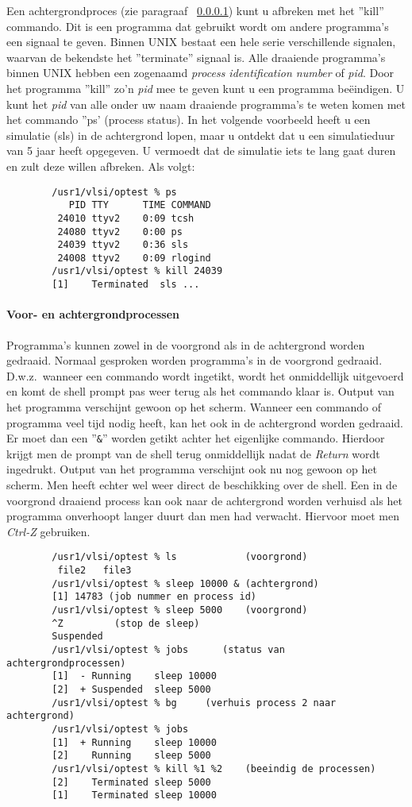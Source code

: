 Een achtergrondproces (zie paragraaf ~\ref{Voor- en achtergrondprocessen})
kunt u afbreken met het ''kill'' commando.
Dit is een programma dat gebruikt wordt om andere programma's een signaal te geven.
Binnen UNIX bestaat een hele serie verschillende signalen,
waarvan de bekendste het ''terminate'' signaal is.
Alle draaiende programma's binnen UNIX hebben een
zogenaamd {\em process identification number} of {\em pid}.
Door het programma ''kill'' zo'n {\em pid} mee te geven
kunt u een programma be\"eindigen.
U kunt het {\em pid} van alle onder uw naam draaiende programma's te weten komen met
het commando ''ps' (process status).
In het volgende voorbeeld heeft u een simulatie (sls) in de achtergrond lopen,
maar u ontdekt dat u een simulatieduur van 5 jaar heeft opgegeven.
U vermoedt dat de simulatie iets te lang gaat duren
en zult deze willen afbreken.
Als volgt:
\begin{verbatim}
        /usr1/vlsi/optest % ps
           PID TTY      TIME COMMAND
         24010 ttyv2    0:09 tcsh  
         24080 ttyv2    0:00 ps 
         24039 ttyv2    0:36 sls
         24008 ttyv2    0:09 rlogind
        /usr1/vlsi/optest % kill 24039
        [1]    Terminated  sls ...
\end{verbatim}
\paragraph{Voor- en achtergrondprocessen}
\label{Voor- en achtergrondprocessen}
Programma's kunnen zowel in de voorgrond als in de
achtergrond worden gedraaid.
Normaal gesproken worden programma's in de voorgrond gedraaid.
D.w.z.\ wanneer een commando wordt ingetikt, wordt het onmiddellijk uitgevoerd
en komt de shell prompt pas weer terug als het commando klaar is.
Output van het programma verschijnt gewoon op het scherm.
Wanneer een commando of programma veel tijd nodig heeft, kan het ook
in de achtergrond worden gedraaid.
Er moet dan een ''{\tt \&}'' worden getikt achter
het eigenlijke commando. Hierdoor krijgt men de prompt van
de shell terug onmiddellijk nadat de {\em Return} wordt ingedrukt.
Output van het programma verschijnt ook nu nog gewoon op het scherm.
Men heeft echter wel weer direct de beschikking over de shell.
Een in de voorgrond draaiend process kan ook naar de achtergrond worden
verhuisd als het programma onverhoopt langer duurt dan men had verwacht.
Hiervoor moet men {\em Ctrl-Z} gebruiken.
\begin{verbatim}
        /usr1/vlsi/optest % ls            (voorgrond)
         file2   file3
        /usr1/vlsi/optest % sleep 10000 & (achtergrond)
        [1] 14783 (job nummer en process id)
        /usr1/vlsi/optest % sleep 5000    (voorgrond)
        ^Z         (stop de sleep)
        Suspended
        /usr1/vlsi/optest % jobs      (status van achtergrondprocessen)
        [1]  - Running    sleep 10000
        [2]  + Suspended  sleep 5000
        /usr1/vlsi/optest % bg     (verhuis process 2 naar achtergrond)
        /usr1/vlsi/optest % jobs
        [1]  + Running    sleep 10000
        [2]    Running    sleep 5000
        /usr1/vlsi/optest % kill %1 %2    (beeindig de processen)
        [2]    Terminated sleep 5000
        [1]    Terminated sleep 10000
\end{verbatim}
